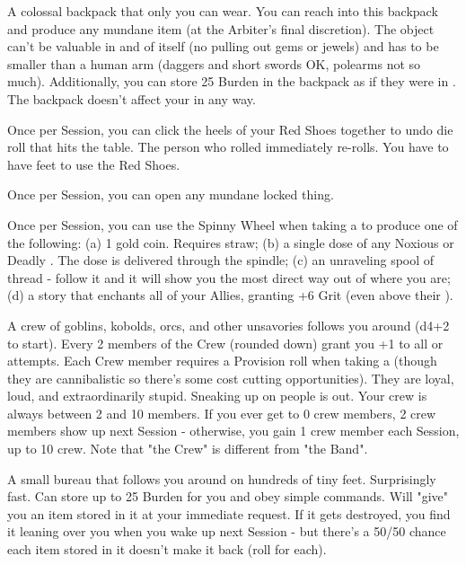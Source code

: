 \begin{multicols*}{2}

A colossal backpack that only you can wear.  You can reach into this backpack and produce any mundane item (at the Arbiter's final discretion).  The object can't be valuable in and of itself (no pulling out gems or jewels) and has to be smaller than a human arm (daggers and short swords OK, polearms not so much).  Additionally, you can store 25 Burden in the backpack as if they were in .  The backpack doesn't affect your \MD in any way. 



Once per Session, you can click the heels of your Red Shoes together to undo  die roll that hits the table.  The person who rolled immediately re-rolls.  You have to have feet to use the Red Shoes.


Once per Session, you can open any mundane locked thing.  



Once per Session, you can use the Spinny Wheel when taking a  to produce one of the following: (a) 1 gold coin.  Requires straw; (b) a single dose of any Noxious or Deadly .  The dose is delivered through the spindle; (c) an unraveling spool of thread - follow it and it will show you the most direct way out of where you are; (d) a story that enchants all of your Allies, granting +6 Grit (even above their \MAX).


A crew of goblins, kobolds, orcs, and other unsavories follows you around (d4+2 to start).  Every 2 members of the Crew (rounded down) grant you +1 to all \RO or \RB attempts.  Each Crew member requires a Provision roll when taking a  (though they are cannibalistic so there's some cost cutting opportunities).  They are loyal, loud, and extraordinarily stupid.  Sneaking up on people is out.  Your crew is always between 2 and 10 members.  If you ever get to 0 crew members, 2 crew members show up next Session - otherwise, you gain 1 crew member each Session, up to 10 crew. Note that "the Crew" is different from "the Band".


A small bureau that follows you around on hundreds of tiny feet.  Surprisingly fast.  Can store up to 25 Burden for you and obey simple commands.  Will "give" you an item stored in it at your immediate request. If it gets destroyed, you find it leaning over you when you wake up next Session - but there's a 50/50 chance each item stored in it doesn't make it back (roll for each).


\end{multicols*}
